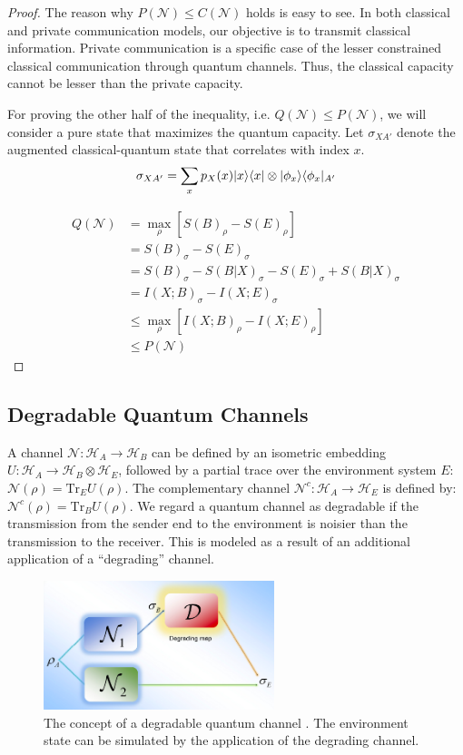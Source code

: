 \begin{proof}
The reason why $P(\mathcal{N}) \leq C(\mathcal{N})$ holds is easy to see. In both classical and private communication models, our objective is to transmit classical information. Private communication is a specific case of the lesser constrained classical communication through quantum channels. Thus, the classical capacity cannot be lesser than the private capacity.

For proving the other half of the inequality, i.e. $Q(\mathcal{N}) \leq P(\mathcal{N})$, we will consider a pure state that maximizes the quantum capacity. Let $\sigma_{XA'}$ denote the augmented classical-quantum state that correlates with index $x$.
$$\sigma_{XA'} = \sum_{x} p_X(x) \lvert x\rangle\langle x\rvert \otimes \lvert\phi_x\rangle\langle\phi_x\rvert_{A'}$$

\begin{align*}
Q(\mathcal{N}) &= \max_{\rho} \left[ S(B)_{\rho} - S(E)_{\rho} \right] \\
&= S(B)_{\sigma} - S(E)_{\sigma}\\
&= S(B)_{\sigma} - S(B|X)_{\sigma} - S(E)_{\sigma} + S(B|X)_{\sigma}\\
&= I(X;B)_{\sigma} - I(X;E)_{\sigma} \\
&\leq \max_{\rho} \left[ I(X;B)_{\rho} - I(X;E)_{\rho} \right] \\
&\leq P(\mathcal{N})
\end{align*}
\end{proof}

\subsection{Degradable Quantum Channels}

A channel $\mathcal{N}: \mathcal{H}_A \rightarrow \mathcal{H}_B$ can be defined by an isometric embedding $U: \mathcal{H}_A \rightarrow \mathcal{H}_B \otimes \mathcal{H}_E$, followed by a partial trace over the environment system $E$: $\mathcal{N}(\rho) = \mathrm{Tr}_E U(\rho)$. The complementary channel $\mathcal{N}^c: \mathcal{H}_A \rightarrow \mathcal{H}_E$ is defined by: $\mathcal{N}^c(\rho) = \mathrm{Tr}_B U(\rho)$. We regard a quantum channel as degradable if the transmission from the sender end to the environment is noisier than the transmission to the receiver. This is modeled as a result of an additional application of a ``degrading'' channel.

\begin{figure}[H]
    \centering
    \includegraphics[width=0.6\textwidth]{figures/degradable_quantum_channel.png}
    \caption{The concept of a degradable quantum channel \cite{Gyongyosi2012PropertiesOT}. The environment state can be simulated by the application of the degrading channel.}
\end{figure}

